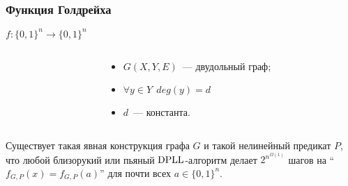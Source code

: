 \begin{frame}
	\frametitle{Функция Голдрейха}
	$f:\{0, 1\}^n \rightarrow \{0, 1\}^n$

    \pause

    \begin{columns}
    	\begin{column}{5.5cm}
            
        \end{column}

        \pause
        \pause
        \begin{column}{5.5cm}
            \begin{itemize}
	            \item $G(X, Y, E)$~--- двудольный граф;
            	\pause
                \item $\forall y \in Y ~~ deg(y) = d$
            	\pause
            	\item $d$~--- константа.
            \end{itemize}
        \end{column}
	\end{columns}
    

    \pause
    \begin{theorem}
		Существует такая \alert{явная} конструкция графа $G$ и такой нелинейный предикат $P$, что любой близорукий или пьяный
        $\mathrm{DPLL}$-алгоритм делает $2^{n^{\Omega(1)}}$ шагов на ``$f_{G, P}(x) = f_{G, P}(a)$'' для почти всех $a \in \{0, 1\}^n$.
	\end{theorem}
\end{frame}